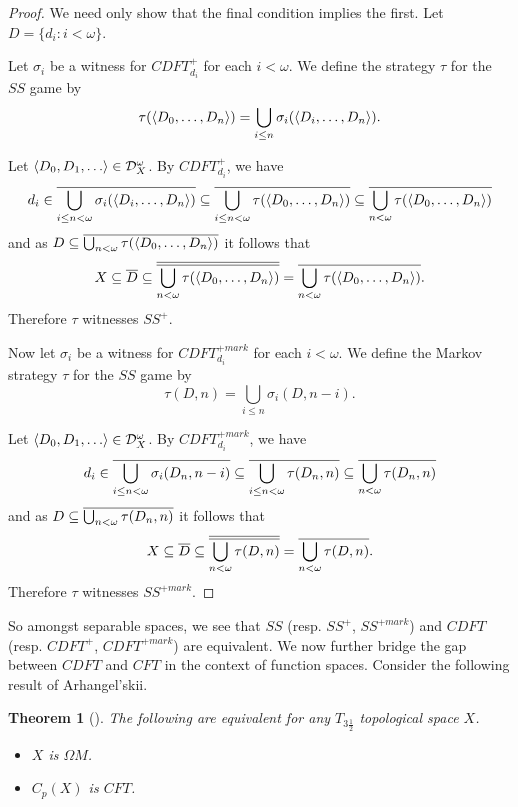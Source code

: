 \documentclass{amsart}
\theoremstyle{plain}
\newtheorem{theorem}{Theorem}
\theoremstyle{definition}
\theoremstyle{remark}
\theoremstyle{plain}
\theoremstyle{definition}
\theoremstyle{remark}
\begin{document}
\begin{proof}
  We need only show that the final condition implies the first.
  Let \(D=\{d_i:i<\omega\}\).

  Let \(\sigma_i\) be a witness for \(CDFT_{d_i}^+\)
  for each \(i<\omega\). We define the strategy \(\tau\) for the
  \(SS\) game by
  \[
    \tau(\langle D_0,\dots,D_n\rangle)
      =
    \bigcup_{i\leq n}
    \sigma_i(\langle D_i,\dots,D_n\rangle)
  .\]

  Let \(\<D_0,D_1,\dots\>\in\mc D_X^\omega\).
  By \(CDFT_{d_i}^+\), we have
  \[
    d_i
      \in
    \overline{\bigcup_{i\leq n<\omega}\sigma_i(\langle D_i,\dots,D_n\rangle)}
      \subseteq
    \overline{\bigcup_{i\leq n<\omega}\tau(\langle D_0,\dots,D_n\rangle)}
      \subseteq
    \overline{\bigcup_{n<\omega}\tau(\langle D_0,\dots,D_n\rangle)}
  \]
  and as \(D\subseteq\overline{\bigcup_{n<\omega}\tau(\langle D_0,\dots,D_n\rangle)}\)
  it follows that
  \[
    X
      \subseteq
    \overline{D}
      \subseteq
    \overline{\overline{\bigcup_{n<\omega}\tau(\langle D_0,\dots,D_n\rangle)}}
      =
    \overline{\bigcup_{n<\omega}\tau(\langle D_0,\dots,D_n\rangle)}
  .\]
  Therefore \(\tau\) witnesses \(SS^+\).

  Now let \(\sigma_i\) be a witness for \(CDFT_{d_i}^{+mark}\)
  for each \(i<\omega\). We define the Markov strategy \(\tau\) for the
  \(SS\) game by
  \[
    \tau(D,n)
      =
    \bigcup_{i\leq n}
    \sigma_i(D,n-i)
  .\]

  Let \(\<D_0,D_1,\dots\>\in\mc D_X^\omega\).
  By \(CDFT_{d_i}^{+mark}\), we have
  \[
    d_i
      \in
    \overline{\bigcup_{i\leq n<\omega}\sigma_i(D_n,n-i)}
      \subseteq
    \overline{\bigcup_{i\leq n<\omega}\tau(D_n,n)}
      \subseteq
    \overline{\bigcup_{n<\omega}\tau(D_n,n)}
  \]
  and as \(D\subseteq\overline{\bigcup_{n<\omega}\tau(D_n,n)}\)
  it follows that
  \[
    X
      \subseteq
    \overline{D}
      \subseteq
    \overline{\overline{\bigcup_{n<\omega}\tau(D,n)}}
      =
    \overline{\bigcup_{n<\omega}\tau(D,n)}
  .\]
  Therefore \(\tau\) witnesses \(SS^{+mark}\).
\end{proof}

So amongst separable spaces, we see that \(SS\)
(resp. \(SS^+\), \(SS^{+mark}\)) and
\(CDFT\) (resp. \(CDFT^+\), \(CDFT^{+mark}\))
are equivalent. We now further bridge the gap between \(CDFT\)
and \(CFT\) in the context of function spaces.
Consider the following result of Arhangel'skii.

\begin{theorem}[\cite{MR837289}]
  The following are equivalent for any \(T_{3\frac{1}{2}}\)
  topological space \(X\).
    \begin{itemize}
      \item \(X\) is \(\Omega M\).
      \item \(C_p(X)\) is \(CFT\).
    \end{itemize}
\end{theorem}
\end{document}
